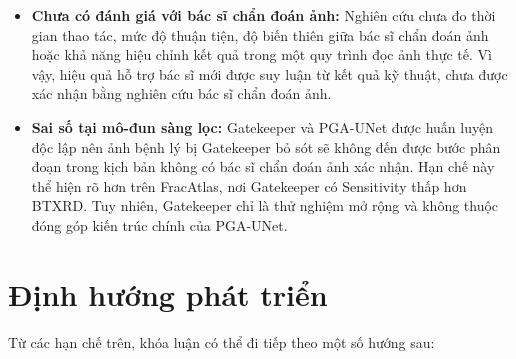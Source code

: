 \begin{itemize}
    \item \textbf{Chưa có đánh giá với bác sĩ chẩn đoán ảnh:}
    Nghiên cứu chưa đo thời gian thao tác, mức độ thuận tiện, độ biến thiên giữa bác sĩ chẩn đoán ảnh hoặc khả năng hiệu chỉnh kết quả trong một quy trình đọc ảnh thực tế. Vì vậy, hiệu quả hỗ trợ bác sĩ mới được suy luận từ kết quả kỹ thuật, chưa được xác nhận bằng nghiên cứu bác sĩ chẩn đoán ảnh.

    \item \textbf{Sai số tại mô-đun sàng lọc:}
    Gatekeeper và PGA-UNet được huấn luyện độc lập nên ảnh bệnh lý bị Gatekeeper bỏ sót sẽ không đến được bước phân đoạn trong kịch bản không có bác sĩ chẩn đoán ảnh xác nhận. Hạn chế này thể hiện rõ hơn trên FracAtlas, nơi Gatekeeper có Sensitivity thấp hơn BTXRD. Tuy nhiên, Gatekeeper chỉ là thử nghiệm mở rộng và không thuộc đóng góp kiến trúc chính của PGA-UNet.
\end{itemize}

\section{Định hướng phát triển}
\label{sec:tuong_lai}

Từ các hạn chế trên, khóa luận có thể đi tiếp theo một số hướng sau:

